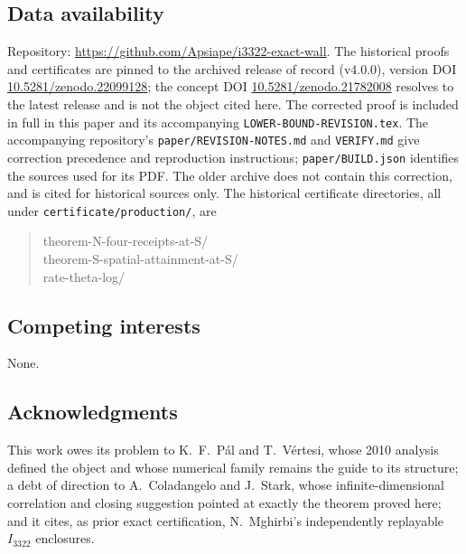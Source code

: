\documentclass[11pt]{article}
\theoremstyle{remark}
\begin{document}
\subsection*{Data availability}
Repository: \url{https://github.com/Apsiape/i3322-exact-wall}. The historical
proofs and certificates are pinned to the archived release of record
(v4.0.0), version DOI
\href{https://doi.org/10.5281/zenodo.22099128}{10.5281/zenodo.22099128};
the concept
DOI \href{https://doi.org/10.5281/zenodo.21782008}{10.5281/zenodo.21782008}
resolves to the latest release and is not the object cited here.
The corrected proof is included in full in this paper and its accompanying
\texttt{LOWER-BOUND-REVISION.tex}. The accompanying repository's
\texttt{paper/REVISION-NOTES.md} and \texttt{VERIFY.md} give correction
precedence and reproduction instructions; \texttt{paper/BUILD.json}
identifies the sources used for its PDF. The older archive does not
contain this correction, and is cited for historical sources only.
The historical certificate directories, all under
\texttt{certificate/production/}, are
\begin{quote}\ttfamily\raggedright
theorem-N-four-receipts-at-S/\\
theorem-S-spatial-attainment-at-S/\\
rate-theta-log/
\end{quote}

\subsection*{Competing interests}
None.

\subsection*{Acknowledgments}
This work owes its problem to K.~F.~P\'al and T.~V\'ertesi, whose 2010
analysis defined the object and whose numerical family remains the guide to
its structure; a debt of direction to A.~Coladangelo and J.~Stark, whose
infinite-dimensional correlation and closing suggestion pointed at exactly
the theorem proved here; and it cites, as prior exact certification,
N.~Mghirbi's independently replayable $I_{3322}$ enclosures.
\end{document}
